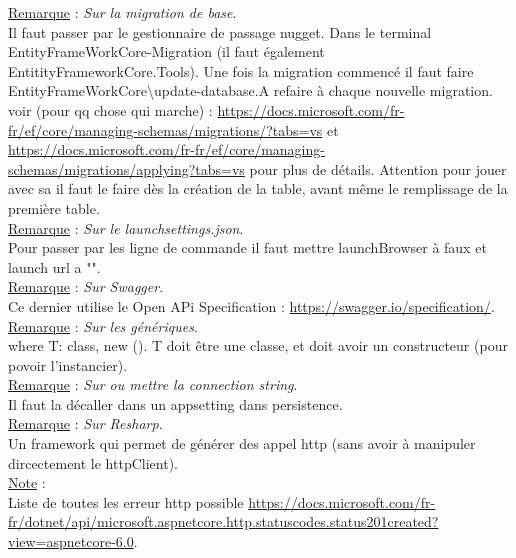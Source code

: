 \documentclass[a4paper,12pt,twoside]{article}
\newcommand{\rem}[2]{\noindent\underline{Remarque} : \textit{#1}.\\ \indent #2}
\newcommand{\note}[1]{\noindent\underline{Note} : \\ \indent #1}
\begin{document}
\rem{Sur la migration de base}{Il faut passer par le gestionnaire de passage nugget. Dans le terminal EntityFrameWorkCore\Add-Migration (il faut également EntitityFrameworkCore.Tools). Une fois la migration commencé il faut faire EntityFrameWorkCore\textbackslash update-database.A refaire à chaque nouvelle migration. voir (pour qq chose qui marche) : \url{https://docs.microsoft.com/fr-fr/ef/core/managing-schemas/migrations/?tabs=vs} et \url{https://docs.microsoft.com/fr-fr/ef/core/managing-schemas/migrations/applying?tabs=vs} pour plus de détails. Attention pour jouer avec sa il faut le faire dès la création de la table, avant même le remplissage de la première table.}\\

\rem{Sur le launchsettings.json}{Pour passer par les ligne de commande il faut mettre launchBrowser à faux et launch url a "".}\\

\rem{Sur Swagger}{Ce dernier utilise le Open APi Specification : \url{https://swagger.io/specification/}.}\\

\rem{Sur les génériques}{where T: class, new (). T doit être une classe, et doit avoir un constructeur (pour povoir l'instancier).}\\

\rem{Sur ou mettre la connection string}{Il faut la décaller dans un appsetting dans persistence.}\\

\rem{Sur Resharp}{Un framework qui permet de générer des appel http (sans avoir à manipuler dircectement le httpClient).}\\

\note{Liste de toutes les erreur http possible \url{https://docs.microsoft.com/fr-fr/dotnet/api/microsoft.aspnetcore.http.statuscodes.status201created?view=aspnetcore-6.0}.}\\

\newpage
\printglossary[type=\acronymtype]%
\glsaddallunused %
\printglossary[type = main,nonumberlist]%
\end{document}

